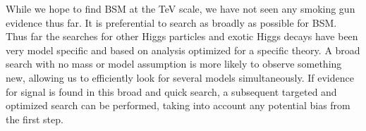 
While we hope to find BSM at the TeV scale, we have not seen any smoking gun evidence thus far.  It is preferential to search as broadly as possible for BSM.  Thus far the searches for other Higgs particles and exotic Higgs decays have been very model specific and based on analysis optimized for a specific theory.  A broad search with no mass or model assumption is more likely to observe something new, allowing us to efficiently look for several models simultaneously.  If evidence for signal is found in this broad and quick search,  a subsequent targeted and optimized search can be performed, taking into account any potential bias from the first step.




